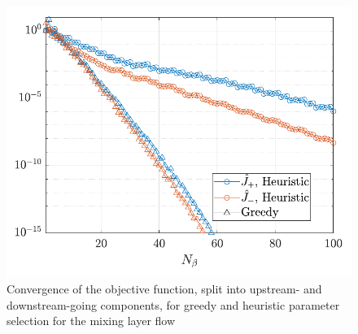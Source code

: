 \begin{figure}
    \centering
    \includegraphics[width=0.5\linewidth]{figures/Mixing_Obj_R_pm.pdf}
    \caption{Convergence of the objective function, split into upstream- and downstream-going components, for greedy and heuristic parameter selection for the mixing layer flow}
    \label{fig:mixing-obj-pm}
\end{figure}

